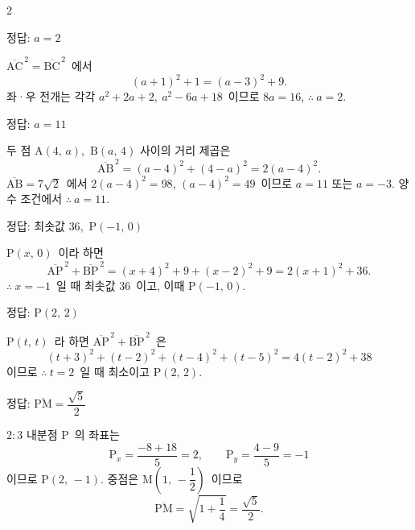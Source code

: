 \documentclass[10pt,fleqn]{article}   %
\begin{document}
\begin{multicols*}{2}

\begin{dmanswerbox}
정답: $a=2$
\end{dmanswerbox}

$\overline{\mathrm{AC}}^{\,2}=\overline{\mathrm{BC}}^{\,2}$\ 에서
\[ (a+1)^2 + 1 = (a-3)^2 + 9. \]
좌·우 전개는 각각 $a^2+2a+2,\ a^2-6a+18$\ 이므로 $8a = 16$, $\therefore\ a=2$.

\begin{dmanswerbox}
정답: $a=11$
\end{dmanswerbox}

두 점 $\mathrm{A}(4,\,a)$,\ $\mathrm{B}(a,\,4)$ 사이의 거리 제곱은
\[ \overline{\mathrm{AB}}^{\,2} = (a-4)^2 + (4-a)^2 = 2(a-4)^2. \]
$\overline{\mathrm{AB}}=7\sqrt{2}$\ 에서 $2(a-4)^2 = 98$, $(a-4)^2 = 49$\ 이므로 $a=11$ 또는 $a=-3$. 양수 조건에서 $\therefore\ a=11$.

\begin{dmanswerbox}
정답: 최솟값 $36$,\ $\mathrm{P}(-1,\,0)$
\end{dmanswerbox}

$\mathrm{P}(x,\,0)$\ 이라 하면
\[ \overline{\mathrm{AP}}^{\,2}+\overline{\mathrm{BP}}^{\,2} = (x+4)^2+9 + (x-2)^2+9 = 2(x+1)^2 + 36. \]
$\therefore\ x=-1$\ 일 때 최솟값 $36$\ 이고, 이때 $\mathrm{P}(-1,\,0)$.

\begin{dmanswerbox}
정답: $\mathrm{P}(2,\,2)$
\end{dmanswerbox}

$\mathrm{P}(t,\,t)$\ 라 하면 $\overline{\mathrm{AP}}^{\,2}+\overline{\mathrm{BP}}^{\,2}$\ 은
\[ (t+3)^2+(t-2)^2+(t-4)^2+(t-5)^2 = 4(t-2)^2 + 38 \]
이므로 $\therefore\ t=2$\ 일 때 최소이고 $\mathrm{P}(2,\,2)$.

\begin{dmanswerbox}
정답: $\overline{\mathrm{PM}} = \dfrac{\sqrt{5}}{2}$
\end{dmanswerbox}

$2 : 3$ 내분점 $\mathrm{P}$\ 의 좌표는
$$\mathrm{P}_x = \dfrac{-8+18}{5} = 2,\qquad \mathrm{P}_y = \dfrac{4-9}{5} = -1$$
이므로 $\mathrm{P}(2,\,-1)$. 중점은 $\mathrm{M}\!\left(1,\,-\dfrac{1}{2}\right)$\ 이므로
\[ \overline{\mathrm{PM}} = \sqrt{1+\dfrac{1}{4}} = \dfrac{\sqrt{5}}{2}. \]


\end{multicols*}
\end{document}
